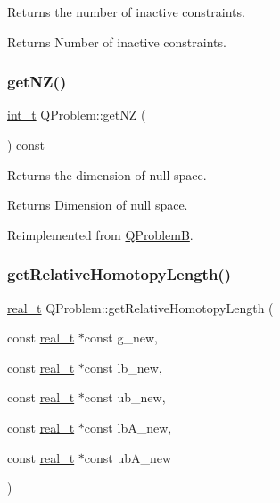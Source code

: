 Returns the number of inactive constraints. \begin{DoxyReturn}{Returns}
Number of inactive constraints. 
\end{DoxyReturn}
\mbox{\label{class_q_problem_abc038fbdddcb04db736cdd3fab4d9a1a}} 
\subsubsection{\texorpdfstring{get\+N\+Z()}{getNZ()}}
{\footnotesize\ttfamily \hyperlink{_types_8hpp_ab6fd6105e64ed14a0c9281326f05e623}{int\+\_\+t} Q\+Problem\+::get\+NZ (\begin{DoxyParamCaption}{ }\end{DoxyParamCaption}) const\hspace{0.3cm}{\ttfamily [virtual]}}

Returns the dimension of null space. \begin{DoxyReturn}{Returns}
Dimension of null space. 
\end{DoxyReturn}


Reimplemented from \hyperlink{class_q_problem_b_a3495286868b8a38e788700ad0e64fbc4}{Q\+ProblemB}.

\mbox{\label{class_q_problem_a030e1d6ba083a620ebc2140615bfd56f}} 
\subsubsection{\texorpdfstring{get\+Relative\+Homotopy\+Length()}{getRelativeHomotopyLength()}}
{\footnotesize\ttfamily \hyperlink{qp_o_a_s_e_s__wrapper_8h_a0d00e2b3dfadee81331bbb39068570c4}{real\+\_\+t} Q\+Problem\+::get\+Relative\+Homotopy\+Length (\begin{DoxyParamCaption}\item[{const \hyperlink{qp_o_a_s_e_s__wrapper_8h_a0d00e2b3dfadee81331bbb39068570c4}{real\+\_\+t} $\ast$const}]{g\+\_\+new,  }\item[{const \hyperlink{qp_o_a_s_e_s__wrapper_8h_a0d00e2b3dfadee81331bbb39068570c4}{real\+\_\+t} $\ast$const}]{lb\+\_\+new,  }\item[{const \hyperlink{qp_o_a_s_e_s__wrapper_8h_a0d00e2b3dfadee81331bbb39068570c4}{real\+\_\+t} $\ast$const}]{ub\+\_\+new,  }\item[{const \hyperlink{qp_o_a_s_e_s__wrapper_8h_a0d00e2b3dfadee81331bbb39068570c4}{real\+\_\+t} $\ast$const}]{lb\+A\+\_\+new,  }\item[{const \hyperlink{qp_o_a_s_e_s__wrapper_8h_a0d00e2b3dfadee81331bbb39068570c4}{real\+\_\+t} $\ast$const}]{ub\+A\+\_\+new }\end{DoxyParamCaption})\hspace{0.3cm}{\ttfamily [protected]}}

